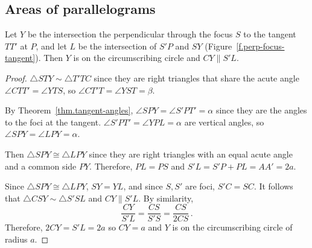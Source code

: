 
\subsection{Areas of parallelograms}

\begin{theorem}\label{thm.perp-tangent}
Let $Y$ be the intersection the perpendicular through the focus $S$ to the tangent $TT'$ at $P$, and let $L$ be the intersection of $S'P$ and $SY$ (Figure~\ref{f.perp-focus-tangent}). Then $Y$ is on the circumscribing circle and $CY\parallel S'L$.
\end{theorem}

\begin{proof}

$\triangle STY\sim\triangle T'TC$ since they are right triangles that share the acute angle $\angle CTT'=\angle YTS$, so $\angle CT'T=\angle YST=\beta$.

By Theorem~\ref{thm.tangent-angles}, $\angle SPY=\angle S'PT'=\alpha$ since they are the angles to the foci at the tangent. $\angle S'PT'=\angle YPL=\alpha$ are vertical angles, so $\angle SPY=\angle LPY=\alpha$. 

Then $\triangle SPY\cong\triangle LPY$ since they are right triangles with an equal acute angle and a common side $PY$. Therefore, $PL=PS$ and $S'L=S'P+PL=AA'=2a$.

Since $\triangle SPY\cong\triangle LPY$, $SY=YL$, and since $S,S'$ are foci, $S'C=SC$. It follows that $\triangle CSY\sim \triangle S'SL$ and $CY\parallel S'L$. By similarity,
\[
\frac{CY}{S'L}=\frac{CS}{S'S}=\frac{CS}{2CS}\,.
\]
Therefore, $2CY=S'L=2a$ so $CY=a$ and $Y$ is on the circumscribing circle of radius $a$.\hqed
\end{proof}


